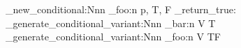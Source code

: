 \prg_new_conditional:Nnn
  \module_foo:n
  { p, T, F }
  { \prg_return_true: }
\prg_generate_conditional_variant:Nnn  %
  \module_bar:n
  { V }
  { T }
\prg_generate_conditional_variant:Nnn  %
  \module_foo:n
  { V }
  { TF }
